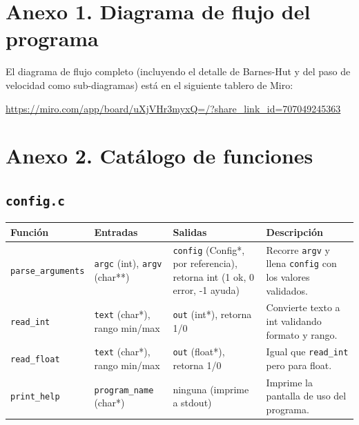 \documentclass[11pt]{article}
\begin{document}
\clearpage
\appendix
\section{Anexo 1. Diagrama de flujo del programa}

El diagrama de flujo completo (incluyendo el detalle de Barnes-Hut y del
paso de velocidad como sub-diagramas) está en el siguiente tablero de
Miro:

\begin{center}
\url{https://miro.com/app/board/uXjVHr3myxQ=/?share_link_id=707049245363}
\end{center}

\clearpage
\section{Anexo 2. Catálogo de funciones}

\subsection*{\texttt{config.c}}
\begin{longtable}{L{4cm}L{4.1cm}L{2.2cm}L{3.7cm}}
\toprule
Función & Entradas & Salidas & Descripción \\
\midrule
\texttt{parse\_arguments} & \texttt{argc} (int), \texttt{argv} (char**) & \texttt{config} (Config*, por referencia), retorna int (1 ok, 0 error, -1 ayuda) & Recorre \texttt{argv} y llena \texttt{config} con los valores validados. \\
\texttt{read\_int} & \texttt{text} (char*), rango min/max & \texttt{out} (int*), retorna 1/0 & Convierte texto a int validando formato y rango. \\
\texttt{read\_float} & \texttt{text} (char*), rango min/max & \texttt{out} (float*), retorna 1/0 & Igual que \texttt{read\_int} pero para float. \\
\texttt{print\_help} & \texttt{program\_name} (char*) & ninguna (imprime a stdout) & Imprime la pantalla de uso del programa. \\
\bottomrule
\end{longtable}
\end{document}
